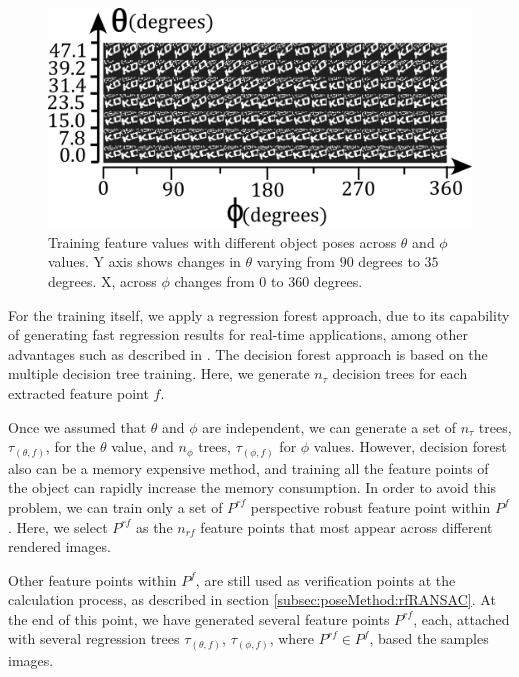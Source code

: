 \documentclass[annual]{acmsiggraph}
\begin{document}
\begin{figure}[h]
\includegraphics[width =\columnwidth]{images/patchesAcross.png}
\caption{Training feature values with different object poses across $\theta$ and $\phi$ values. Y axis shows changes in $\theta$ varying from $90$ degrees to $35$ degrees. X, across $\phi$ changes from $0$ to $360$ degrees.}
\label{img:samplesExamples}
\end{figure}

For the training itself, we apply a regression forest approach, due to its capability of generating fast regression results for real-time applications, among other advantages such as described in \cite{Criminisi:Book}. The decision forest approach is based on the multiple decision tree training\cite{Criminisi:Book}. Here, we generate $n_{\tau}$ decision trees for each extracted feature point $f$.  


Once we assumed that $\theta$ and $\phi$ are independent, we can generate a set of $n_{\tau}$ trees, $\tau_{(\theta,f)}$, for the $\theta$ value, and $n_{\phi}$ trees, $\tau_{(\phi,f)}$ for $\phi$ values. However, decision forest also can be a memory expensive method, and training all the feature points of the object can rapidly increase the memory consumption. In order to avoid this problem, we can train only a set of $P^{rf}$ perspective robust feature point within $P^{f}$. Here, we select $P^{rf}$ as the $n_{rf}$ feature points that most appear across different rendered images.    

Other feature points within $P^{f}$, are still used as verification points at the calculation process, as described in section \ref{subsec:poseMethod:rfRANSAC}. At the end of this point, we have generated several feature points $P^{rf}$, each, attached with several regression trees $\tau_{(\theta, f)}$, $\tau_{(\phi, f)}$, where $P^{rf} \in P^{f}$, based the samples images. 
\end{document}

